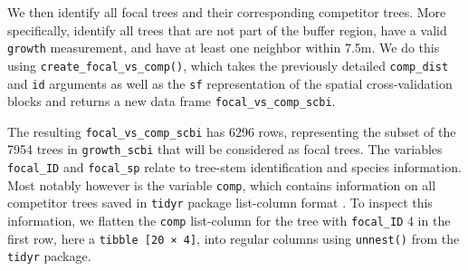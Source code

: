 \documentclass[12pt]{article}
\newenvironment{Shaded}{\begin{snugshade}}{\end{snugshade}}
\newcommand{\CommentTok}[1]{\textcolor[rgb]{0.56,0.35,0.01}{\textit{#1}}}
\newcommand{\DataTypeTok}[1]{\textcolor[rgb]{0.13,0.29,0.53}{#1}}
\newcommand{\KeywordTok}[1]{\textcolor[rgb]{0.13,0.29,0.53}{\textbf{#1}}}
\newcommand{\NormalTok}[1]{#1}
\newcommand{\OperatorTok}[1]{\textcolor[rgb]{0.81,0.36,0.00}{\textbf{#1}}}
\newcommand{\StringTok}[1]{\textcolor[rgb]{0.31,0.60,0.02}{#1}}
\begin{document}
We then identify all focal trees and their corresponding competitor
trees. More specifically, identify all trees that are not part of the
buffer region, have a valid \texttt{growth} measurement, and have at
least one neighbor within 7.5m. We do this using
\texttt{create\_focal\_vs\_comp()}, which takes the previously detailed
\texttt{comp\_dist} and \texttt{id} arguments as well as the \texttt{sf}
representation of the spatial cross-validation blocks and returns a new
data frame \texttt{focal\_vs\_comp\_scbi}.

\begin{Shaded}
\end{Shaded}

The resulting \texttt{focal\_vs\_comp\_scbi} has 6296 rows, representing
the subset of the 7954 trees in \texttt{growth\_scbi} that will be
considered as focal trees. The variables \texttt{focal\_ID} and
\texttt{focal\_sp} relate to tree-stem identification and species
information. Most notably however is the variable \texttt{comp}, which
contains information on all competitor trees saved in \texttt{tidyr}
package list-column format \citep{tidyr_package}. To inspect this
information, we flatten the \texttt{comp} list-column for the tree with
\texttt{focal\_ID} 4 in the first row, here a
\texttt{tibble\ {[}20\ ×\ 4{]}}, into regular columns using
\texttt{unnest()} from the \texttt{tidyr} package.
\end{document}
